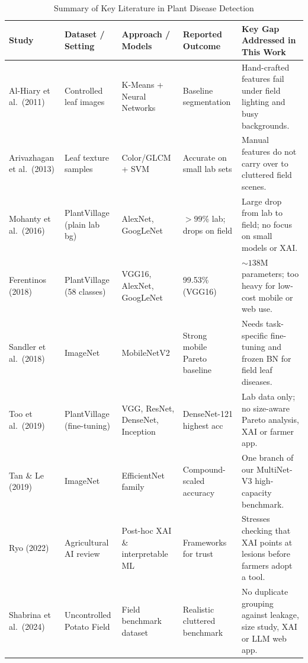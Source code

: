 \begin{table}[htbp]
\caption{Summary of Key Literature in Plant Disease Detection}
\label{tab:lit_summary}
\begin{center}
\small
\begin{tabularx}{\textwidth}{| L{2.2cm} | L{2.3cm} | L{2.5cm} | L{2.2cm} | X |}
\hline
\textbf{Study} & \textbf{Dataset / Setting} & \textbf{Approach / Models} & \textbf{Reported Outcome} & \textbf{Key Gap Addressed in This Work} \\
\hline
Al-Hiary et al.\ (2011) \cite{alhiary2011fast} & Controlled leaf images & K-Means + Neural Networks & Baseline segmentation & Hand-crafted features fail under field lighting and busy backgrounds. \\
\hline
Arivazhagan et al.\ (2013) \cite{arivazhagan2013detection} & Leaf texture samples & Color/GLCM + SVM & Accurate on small lab sets & Manual features do not carry over to cluttered field scenes. \\
\hline
Mohanty et al.\ (2016) \cite{mohanty2016using} & PlantVillage (plain lab bg) & AlexNet, GoogLeNet & $>99\%$ lab; drops on field & Large drop from lab to field; no focus on small models or XAI. \\
\hline
Ferentinos (2018) \cite{ferentinos2018deep} & PlantVillage (58 classes) & VGG16, AlexNet, GoogLeNet & 99.53\% (VGG16) & $\sim 138$M parameters; too heavy for low-cost mobile or web use. \\
\hline
Sandler et al.\ (2018) \cite{sandler2018mobilenetv2} & ImageNet & MobileNetV2 & Strong mobile Pareto baseline & Needs task-specific fine-tuning and frozen BN for field leaf diseases. \\
\hline
Too et al.\ (2019) \cite{too2019comparative} & PlantVillage (fine-tuning) & VGG, ResNet, DenseNet, Inception & DenseNet-121 highest acc & Lab data only; no size-aware Pareto analysis, XAI or farmer app. \\
\hline
Tan \& Le (2019) \cite{tan2019efficientnet} & ImageNet & EfficientNet family & Compound-scaled accuracy & One branch of our MultiNet-V3 high-capacity benchmark. \\
\hline
Ryo (2022) \cite{ryo2022explainable} & Agricultural AI review & Post-hoc XAI \& interpretable ML & Frameworks for trust & Stresses checking that XAI points at lesions before farmers adopt a tool. \\
\hline
Shabrina et al.\ (2024) \cite{shabrina2024novel} & Uncontrolled Potato Field & Field benchmark dataset & Realistic cluttered benchmark & No duplicate grouping against leakage, size study, XAI or LLM web app. \\
\hline
\end{tabularx}
\end{center}
\end{table}

